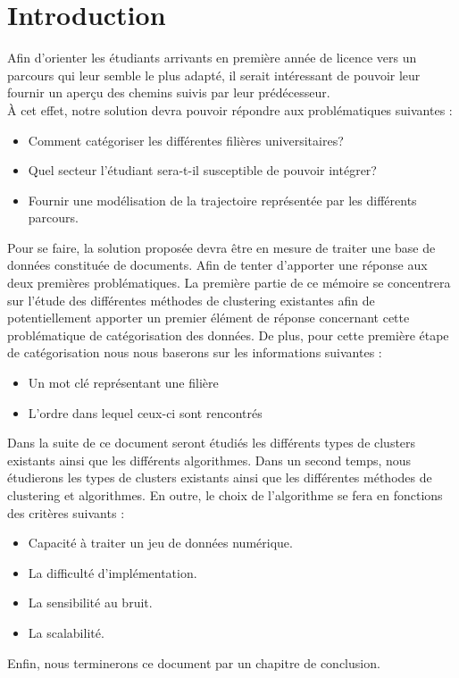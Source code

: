\documentclass[memoire.tex]{subfiles}
\begin{document}
\chapter*{Introduction}
Afin d'orienter les étudiants arrivants en première année de licence vers un parcours qui leur semble le plus adapté, il serait intéressant de pouvoir leur fournir un aperçu des chemins suivis par leur prédécesseur.\\
À cet effet, notre solution devra pouvoir répondre aux problématiques suivantes : 
\begin{itemize}
\item Comment catégoriser les différentes filières universitaires?
\item Quel secteur l'étudiant sera-t-il susceptible de pouvoir intégrer?
\item Fournir une modélisation de la trajectoire représentée par les différents parcours.
\end{itemize}
Pour se faire, la solution proposée devra être en mesure de traiter une base de données constituée de documents. Afin de tenter d'apporter une réponse aux deux premières problématiques. La première partie de ce mémoire se concentrera sur l'étude des différentes méthodes de clustering existantes afin de potentiellement apporter un premier élément de réponse concernant cette problématique de catégorisation des données. De plus, pour cette première étape de catégorisation nous nous baserons sur les informations suivantes : \begin{itemize}
\item Un mot clé représentant une filière
\item L'ordre dans lequel ceux-ci sont rencontrés
\end{itemize}
Dans la suite de ce document seront étudiés les différents types de clusters existants ainsi que les différents algorithmes. Dans un second temps, nous étudierons les types de clusters existants ainsi que les différentes méthodes de clustering et algorithmes. En outre, le choix de l'algorithme se fera en fonctions des critères suivants : \begin{itemize}
\item Capacité à traiter un jeu de données numérique.
\item La difficulté d'implémentation.
\item La sensibilité au bruit.
\item La scalabilité.
\end{itemize} Enfin, nous terminerons ce document par un chapitre de conclusion.\\
\end{document}
